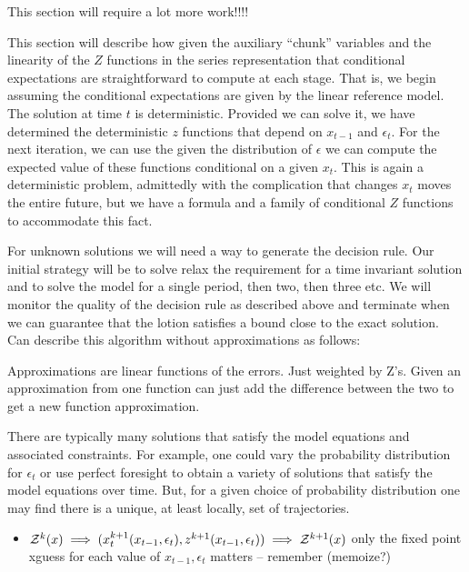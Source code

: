\documentclass[12pt]{article}
\begin{document}
This section will require a lot more work!!!!

This section will describe how given the auxiliary ``chunk'' variables
and the linearity of the $Z$ functions in the series representation
that conditional expectations are straightforward to compute at each stage.
That is, we begin assuming the conditional expectations are given by the
linear reference model.  The solution at time $t$ is deterministic.
Provided we can solve it, we have determined the deterministic $z$ functions
that depend on $x_{t-1}$ and $\epsilon_t$.  For the next iteration,
we can use the given the distribution of $\epsilon$
we can compute the expected value
of these functions conditional on a given $x_t$.  This is again a deterministic
problem, admittedly with the complication that changes
$x_t$ moves the entire future, but we have a formula and a family of conditional
$Z$ functions to accommodate this fact. 


For unknown solutions we will need a way to generate the decision rule.  
Our initial strategy will be to solve 
relax the requirement for a time invariant solution and to solve
the model for a single period, then two, then three etc. We will monitor the
quality of the decision rule as described above and terminate when we 
can guarantee that the lotion satisfies a bound close to the exact solution.
Can describe this algorithm without approximations as follows:


Approximations are linear functions of the errors.  Just weighted by Z's.
Given an approximation from one function can just add the difference between the two  to get a new function approximation.



There are typically many solutions that satisfy the model equations and associated constraints.  For example, one could vary the probability distribution for $\epsilon_t$ or use perfect foresight to obtain a variety of solutions that
satisfy the model equations over time. But, for a given choice of probability distribution one may find there is a unique, at least locally, set of trajectories.


\begin{itemize}
\item $\mathcal{Z}^k(x) \implies (x^{k+1}_t(x_{t-1},\epsilon_t),z^{k+1}(x_{t-1},\epsilon_t)) \implies \mathcal{Z}^{k+1}(x)$  only the fixed point xguess for each value of $x_{t-1},\epsilon_t$ matters -- remember (memoize?)
\end{itemize}
\end{document}
